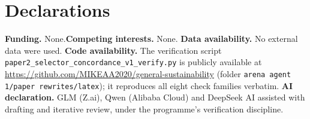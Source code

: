 \documentclass[10pt,twocolumn]{article}
\theoremstyle{definition}
\begin{document}
\section*{Declarations}
\textbf{Funding.} None.\quad \textbf{Competing interests.} None.\quad
\textbf{Data availability.} No external data were used.\quad
\textbf{Code availability.} The verification script
\texttt{paper2\_selector\_concordance\_v1\_verify.py} is publicly
available at \url{https://github.com/MIKEAA2020/general-sustainability}
(folder \texttt{arena agent 1/paper rewrites/latex}); it reproduces all
eight check families verbatim.\quad
\textbf{AI declaration.} GLM (Z.ai), Qwen (Alibaba Cloud) and DeepSeek AI
assisted with drafting and iterative review, under the programme's
verification discipline.
\end{document}
